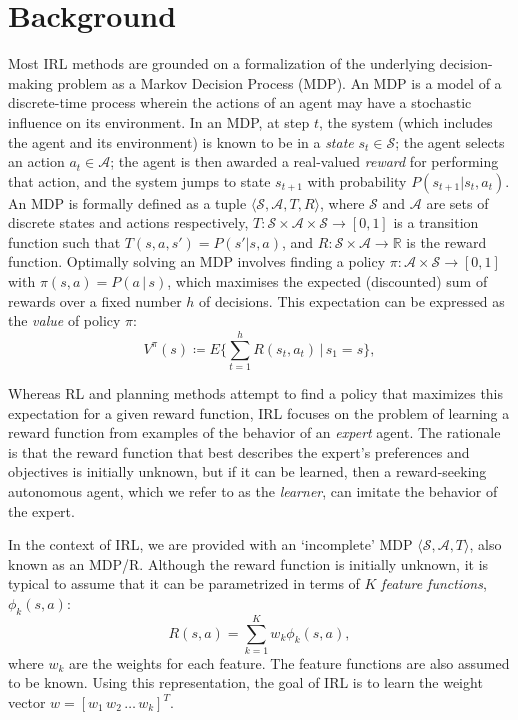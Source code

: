 \documentclass[letterpaper]{article}
\begin{document}
\section{Background}
Most IRL methods are grounded on a formalization of the underlying decision-making problem as a Markov Decision Process (MDP). An MDP is a model of a discrete-time process wherein the actions of an agent may have a stochastic influence on its environment. In an MDP, at step $t$, the system (which includes the agent and its environment) is known to be in a \emph{state} $s_t\in\mathcal{S}$; the agent selects an action $a_t\in\mathcal{A}$; the agent is then awarded a real-valued \emph{reward} for performing that action, and the system jumps to state $s_{t+1}$ with probability $P(s_{t+1}|s_t,a_t)$. An MDP is formally defined as a tuple $\langle\mathcal{S},\mathcal{A},T,R\rangle$, where $\mathcal{S}$ and $\mathcal{A}$ are sets of discrete states and actions respectively, $T:\mathcal{S}\times\mathcal{A}\times\mathcal{S}\rightarrow [0,1]$ is a transition function such that $T(s,a,s')=P(s'|s,a)$, and $R:\mathcal{S}\times\mathcal{A}\rightarrow\mathbb R$ is the reward function. 
Optimally solving an MDP involves finding a policy $\pi:\mathcal{A}\times\mathcal{S}\rightarrow[0,1]$ with $\pi(s,a) = P(a\,|\,s)$, which maximises the expected (discounted) sum of rewards over a fixed number $h$ of decisions. This expectation can be expressed as the \emph{value} of policy $\pi$:
\begin{equation}
\label{eq:value}
 V^\pi(s) \coloneqq E\{\sum_{t = 1}^hR(s_t,a_t)\,\vert\, s_1 = s\} ,
\end{equation}

Whereas RL and planning methods attempt to find a policy that maximizes this expectation for a given reward function, IRL focuses on the problem of learning a reward function from examples of the behavior of an \emph{expert} agent. The rationale is that the reward function that best describes the expert's preferences and objectives is initially unknown, but if it can be learned, then a reward-seeking autonomous agent, which we refer to as the \emph{learner}, can imitate the behavior of the expert.

In the context of IRL, we are provided with an `incomplete' MDP $\langle\mathcal{S},\mathcal{A},T\rangle$, also known as an MDP/R. Although the reward function is initially unknown, it is typical to assume that it can be parametrized in terms of $K$ \emph{feature functions}, $\phi_k(s,a)$:
\begin{equation}
R(s,a) = \sum_{k=1}^Kw_k\phi_k(s,a), \label{eq:rew}
\end{equation}
where $w_k$ are the weights for each feature. The feature functions are also assumed to be known. Using this representation, the goal of IRL is to learn the weight vector $w=[w_1\,w_2\,\ldots\,w_k]^T$.
\end{document}

